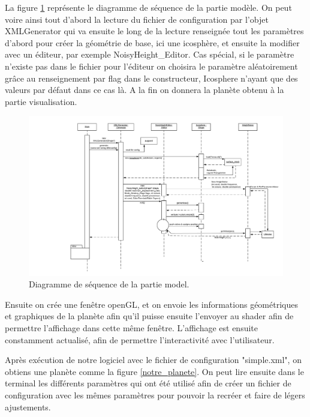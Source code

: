 \documentclass[a4paper]{article}
\begin{document}
La figure \ref{seqmodel} représente le diagramme de séquence de la partie modèle. On peut voire ainsi tout d'abord la lecture du fichier de configuration par l'objet XMLGenerator qui va ensuite le long de la lecture renseignée tout les paramètres d'abord pour créer la géométrie de base, ici une icosphère, et ensuite la modifier avec un éditeur, par exemple NoisyHeight\_Editor. Cas spécial, si le paramètre n'existe pas dans le fichier pour l'éditeur on choisira le paramètre aléatoirement grâce au renseignement par flag dans le constructeur, Icosphere n'ayant que des valeurs par défaut dans ce cas là. A la fin on donnera la planète obtenu à la partie visualisation.\\

\begin{figure}[!h]
    \begin{center}
        \includegraphics[width=\linewidth]{img/seqmodel.png} 
        \caption{Diagramme de séquence de la partie model.}
        \label{seqmodel}
    \end{center}
\end{figure}

Ensuite on crée une fenêtre openGL, et on envoie les informations géométriques et graphiques de la planète afin qu'il puisse ensuite l'envoyer au shader afin de permettre l'affichage dans cette même fenêtre. L'affichage est ensuite constamment actualisé, afin de permettre l'interactivité avec l'utilisateur.

\newpage
Après exécution de notre logiciel avec le fichier de configuration "simple.xml", on obtiens une planète comme la figure \ref{notre_planete}. On peut lire ensuite dans le terminal les différents paramètres qui ont été utilisé afin de créer un fichier de configuration avec les mêmes paramètres pour pouvoir la recréer et faire de légers ajustements.\\
\end{document}
